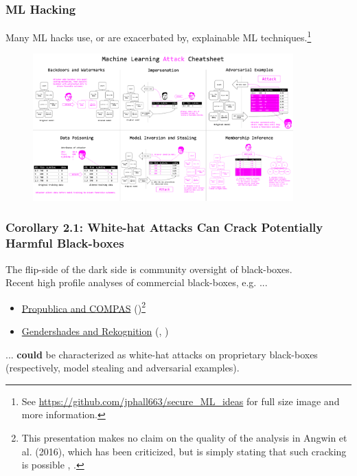 \documentclass[11pt,
               aspectratio=169,
               hyperref={colorlinks}
               ]{beamer}
\begin{document}
	\begin{frame}
	
		\frametitle{ML Hacking}
		
\footnotesize{Many ML hacks use, or are exacerbated by, explainable ML techniques.}\footnote{\tiny{See \url{https://github.com/jphall663/secure_ML_ideas} for full size image and more information.}}
				\begin{figure}
					\begin{center}
						\includegraphics[height=160pt]{img/cheatsheet.png}
					\end{center}
				\end{figure}	
				\normalsize
	
	\end{frame}
	
	\begin{frame}
	
		\frametitle{\large{\textbf{Corollary 2.1}: White-hat Attacks Can Crack Potentially Harmful Black-boxes}}
		\large
		The flip-side of the dark side is community oversight of black-boxes.\\
		\vspace{10pt}
		Recent high profile analyses of commercial black-boxes, e.g. ... 
		\begin{itemize}		
			\item \href{https://www.propublica.org/article/machine-bias-risk-assessments-in-criminal-sentencing}{Propublica and COMPAS} (\citet{angwin16})\footnote{\tiny{This presentation makes no claim on the quality of the analysis in Angwin et al. (2016), which has been criticized, but is simply stating that such cracking is possible \cite{angwin16,}, \cite{flores2016false}}.}
			\item \href{https://medium.com/@Joy.Buolamwini/response-racial-and-gender-bias-in-amazon-rekognition-commercial-ai-system-for-analyzing-faces-a289222eeced}{Gendershades and Rekognition} (\citet{gender_shades}, \citet{raji2019actionable})
		\end{itemize}
		... \textbf{could} be characterized as white-hat attacks on proprietary black-boxes (respectively, model stealing and adversarial examples).

	\end{frame}
	
\end{document}
